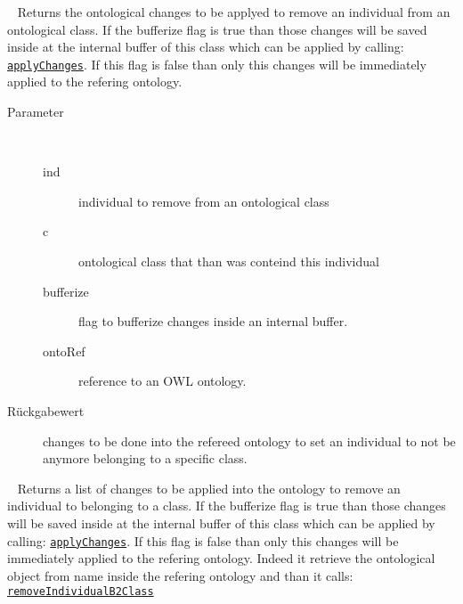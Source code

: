 \begin{description}
~ Returns the ontological changes to be applyed to remove an 
 individual from an ontological class.
 If the bufferize flag is true than those changes will be saved inside at the
 internal buffer of this class which can be applied by calling:
 \texttt{\hyperlink{ontologyFramework.OFContextManagement.OWLLibrary.applyChanges(ontologyFramework.OFContextManagement.OWLReferences)}{applyChanges}}. If this flag is false than only this
 changes will be immediately applied to the refering ontology.
\begin{description}
\item[Parameter] ~
\begin{description}
\item[ind]
individual to remove from an ontological class
\item[c]
ontological class that than was conteind this individual
\item[bufferize]
flag to bufferize changes inside an internal buffer.
\item[ontoRef]
reference to an OWL ontology.
\end{description}
\item[Rückgabewert] 
changes to be done into the refereed ontology to set an individual to not be anymore belonging to a specific class.
\end{description}
\item[{\ltdHypertarget{ontologyFramework.OFContextManagement.OWLLibrary.removeIndividualB2Class(java.lang.String,java.lang.String,boolean,ontologyFramework.OFContextManagement.OWLReferences)}{removeIndividualB2Class}\label{ontologyFramework.OFContextManagement.OWLLibrary.removeIndividualB2Class(java.lang.String,java.lang.String,boolean,ontologyFramework.OFContextManagement.OWLReferences)}}]
~ Returns a list of changes to be applied into the ontology to
 remove an individual to belonging to a class.
 If the bufferize flag is true than those changes will be saved inside at the
 internal buffer of this class which can be applied by calling:
 \texttt{\hyperlink{ontologyFramework.OFContextManagement.OWLLibrary.applyChanges(ontologyFramework.OFContextManagement.OWLReferences)}{applyChanges}}. If this flag is false than only this
 changes will be immediately applied to the refering ontology.
 Indeed it retrieve the ontological object from name inside the refering ontology
 and than it calls: 
 \texttt{\hyperlink{ontologyFramework.OFContextManagement.OWLLibrary.removeIndividualB2Class(org.semanticweb.owlapi.model.OWLNamedIndividual,org.semanticweb.owlapi.model.OWLClass,boolean,ontologyFramework.OFContextManagement.OWLReferences)}{removeIndividualB2Class}}

\end{description}
